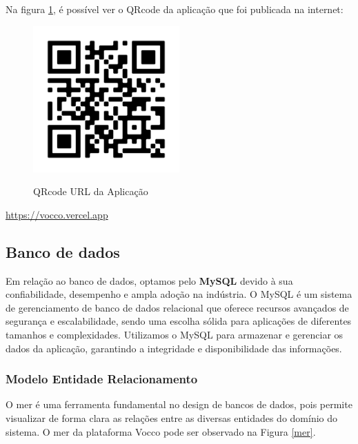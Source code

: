 Na figura \ref{aplicação}, é possível ver o QRcode da aplicação que foi publicada na internet:

\begin{figure}[ht]
        \centering
        \href{https://vocco.vercel.app}{\includegraphics[width=0.5\textwidth]{images/qrcode-url-aplicacao.png}}
        \caption{QRcode URL da Aplicação}
        \label{aplicação}
\end{figure}
\href{https://vocco.vercel.app}{https://vocco.vercel.app}

\newpage
\subsection{Banco de dados}
Em relação ao banco de dados,  optamos pelo \textbf{MySQL} devido à sua confiabilidade, desempenho e ampla adoção na indústria. O MySQL é um sistema de gerenciamento de banco de dados relacional que oferece recursos avançados de segurança e escalabilidade, sendo uma escolha sólida para aplicações de diferentes tamanhos e complexidades. Utilizamos o MySQL para armazenar e gerenciar os dados da aplicação, garantindo a integridade e disponibilidade das informações.


\subsubsection{Modelo Entidade Relacionamento}

O \ac{mer} é uma ferramenta fundamental no design de bancos de dados, pois permite visualizar de forma clara as relações entre as diversas entidades do domínio do sistema. O \ac{mer} da plataforma Vocco pode ser observado na Figura \ref{mer}.

